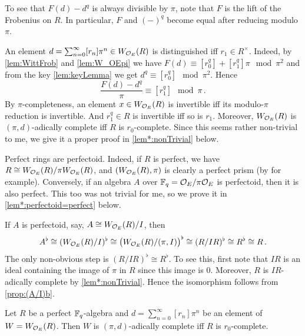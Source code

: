 \documentclass[a4paper, 10pt, oneside, DIV=9, chapterprefix=true, numbers=enddot,bibliography=totoc]{scrbook}
\begin{document}
\begin{rem}\label{rem:perfectoid}
	\begin{numerate}
		\item To see that $F(d)-d^q$ is always divisible by $\pi$, note that $F$ is the lift of the Frobenius on $R$. In particular, $F$ and $(-)^q$ become equal after reducing modulo $\pi$.
		\item An element $d=\sum_{n=0}^\infty[r_n]\pi^n\in W_{\mathcal{O}_E}(R)$ is distinguished iff $r_1\in R^\times$. Indeed, by \cref{lem:WittFrob} and \cref{lem:W_OEpi} we have $F(d)\equiv [r_0^q]+[r_1^q]\pi\mod \pi^2$ and from the key \cref{lem:keyLemma} we get $d^q\equiv [r_0^q]\mod \pi^2$. Hence
		\begin{equation*}
			\frac{F(d)-d^q}{\pi}\equiv [r_1^q]\mod \pi\,.
		\end{equation*}
		By $\pi$-completeness, an element $x\in W_{\mathcal{O}_E}(R)$ is invertible iff its modulo-$\pi$ reduction is invertible. And $r_1^q\in R$ is invertible iff so is $r_1$. Moreover, $W_{\mathcal{O}_E}(R)$ is $(\pi,d)$-adically complete iff $R$ is $r_0$-complete. Since this seems rather non-trivial to me, we give it a proper proof in \cref{lem*:nonTrivial} below.
		\item Perfect rings are perfectoid. Indeed, if $R$ is perfect, we have $R\cong W_{\mathcal{O}_E}(R)/\pi W_{\mathcal{O}_E}(R)$, and $(W_{\mathcal{O}_E}(R),\pi)$ is clearly a perfect prism (by  for example). Conversely, if an algebra $A$ over $\mathbb{F}_q=\mathcal{O}_E/\pi\mathcal{O}_E$ is perfectoid, then it is also perfect. This too was not trivial for me, so we prove it in \cref{lem*:perfectoid=perfect} below.
		\item If $A$ is perfectoid, say, $A\cong W_{\mathcal{O}_E}(R)/I$, then
		\begin{equation*}
			A^\flat\cong (W_{\mathcal{O}_E}(R)/I)^\flat\cong \big(W_{\mathcal{O}_E}(R)/(\pi,I)\big)^\flat\cong (R/IR)^\flat\cong R^\flat\cong R\,.
		\end{equation*}
		The only non-obvious step is $(R/IR)^\flat\cong R^\flat$. To see this, first note that $IR$ is an ideal containing the image of $\pi$ in $R$ since this image is $0$. Moreover, $R$ is $IR$-adically complete by \cref{lem*:nonTrivial}. Hence the isomorphism follows from \cref{prop:(A/I)b}.
	\end{numerate}
\end{rem}
\begin{lem*}\label{lem*:nonTrivial}
	Let $R$ be a perfect $\mathbb{F}_q$-algebra and $d=\sum_{n=0}^\infty[r_n]\pi^n$ be an element of $W=W_{\mathcal{O}_E}(R)$. Then $W$ is $(\pi,d)$-adically complete iff $R$ is $r_0$-complete.
\end{lem*}
\end{document}
